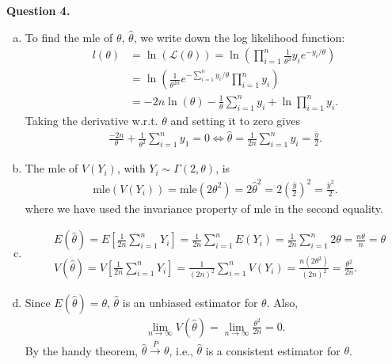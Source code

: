 \documentclass[11pt]{article}
\begin{document}
\noindent \textbf{Question 4.}
\begin{enumerate}[(a)]
	\item To find the mle of $\theta$, $\hat{\theta}$, we write down the log likelihood function:
	\begin{align}
	l(\theta) &= \ln(\mathcal{L}(\theta)) = \ln\left( \prod^n_{i=1}\frac{1}{\theta^2}y_ie^{-y_i/\theta} \right)\\
	&= \ln \left( \frac{1}{\theta^{2n}}e^{-\sum^n_{i=1}y_i/\theta} \prod^n_{i=1}y_i  \right)\\
	&= -2n\ln(\theta) - \frac{1}{\theta}\sum^n_{i=1}y_i + \ln \prod^n_{i=1}y_i.
	\end{align}
	Taking the derivative w.r.t. $\theta$ and setting it to zero gives
	\begin{align}
	\frac{-2n}{\theta} + \frac{1}{\theta^2}\sum^n_{i=1}y_1 = 0 \iff \hat{\theta} = \frac{1}{2n}\sum^n_{i=1}y_i = \frac{\bar{y}}{2}.
	\end{align}
	
	
	\item The mle of $V(Y_i)$, with $Y_i \sim \Gamma(2,\theta)$, is 
	\begin{align*}
	\text{mle}(V(Y_i)) = \text{mle}(2\theta^2) = 2\hat{\theta}^2 = 2\left( \frac{\bar{y}}{2}\right)^2 = \frac{\bar{y}^2}{2}. 
	\end{align*}
	where we have used the invariance property of mle in the second equality. 
	
	
	
	\item 
	\begin{align*}
	&E(\hat{\theta}) = E\left[ \frac{1}{2n}\sum^n_{i=1}Y_i \right] =\frac{1}{2n}\sum^n_{i=1}E(Y_i)= \frac{1}{2n}\sum^n_{i=1}2\theta = \frac{n\theta}{n} = \theta\\
	&V(\hat{\theta}) = V\left[\frac{1}{2n}\sum^n_{i=1}Y_i\right] = \frac{1}{(2n)^2}\sum^n_{i=1}V(Y_i) = \frac{n(2\theta^2)}{(2n)^2} = \frac{\theta^2}{2n}.
	\end{align*}
	
	\item Since $E(\hat{\theta}) = \theta$, $\hat{\theta}$ is an unbiased estimator for $\theta$. Also, 
	\begin{align*}
	\lim_{n\to \infty} V(\hat{\theta}) = \lim_{n\to \infty} \frac{\theta^2}{2n} = 0.
	\end{align*}
	By the handy theorem, $\hat{\theta} \xrightarrow{P} \theta$, i.e., $\hat{\theta}$ is a consistent estimator for $\theta$. 
\end{enumerate}
\end{document}
